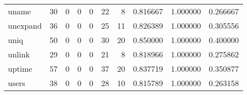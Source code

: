 \begin{tabular}{lrrrrrrrrr}
uname     &                                        30 &                                                  0 &                                                  0 &                                                  0 &                                                 22 &                                                  8 &                                           0.816667 &                               1.000000 &                             0.266667 \\
unexpand  &                                        36 &                                                  0 &                                                  0 &                                                  0 &                                                 25 &                                                 11 &                                           0.826389 &                               1.000000 &                             0.305556 \\
uniq      &                                        50 &                                                  0 &                                                  0 &                                                  0 &                                                 30 &                                                 20 &                                           0.850000 &                               1.000000 &                             0.400000 \\
unlink    &                                        29 &                                                  0 &                                                  0 &                                                  0 &                                                 21 &                                                  8 &                                           0.818966 &                               1.000000 &                             0.275862 \\
uptime    &                                        57 &                                                  0 &                                                  0 &                                                  0 &                                                 37 &                                                 20 &                                           0.837719 &                               1.000000 &                             0.350877 \\
users     &                                        38 &                                                  0 &                                                  0 &                                                  0 &                                                 28 &                                                 10 &                                           0.815789 &                               1.000000 &                             0.263158 \\

\end{tabular}
